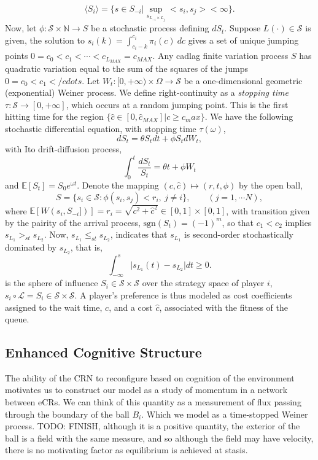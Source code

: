\documentclass[10pt]{article}
\newcommand{\mcL}{\mathcal{L}}
\newcommand{\mcS}{\mathcal{S}}
\theoremstyle{definition}
\begin{document}
$$
    \langle S_i\rangle = \big\lbrace s \in S_{-i} \vert \sup_{s_{L_{-i}\times
    L_j}} <s_i, s_j> < \infty\big\rbrace.
$$
Now, let $\phi:\mcS\times \mathbb{N} \rightarrow S$ be a stochastic process
defining $dS_t$.
Suppose $L(\cdot)\in \mcS$ is given, the solution to
$s_i(k) = \int_{c_i - k}^{c_i} \pi_i(c) \ dc$ gives a set of unique jumping points $0=c_0<
c_1< \cdots < c_{L_{MAX}} = c_{MAX}$. 
Any cadlag finite variation process $S$ has quadratic variation equal to the sum
of the squares of the jumps $0=c_0<c_1</cdots$.
Let $W_t: [0, +\infty) \times \Omega \rightarrow \mcS$ be a
one-dimensional geometric (exponential) Weiner process. We define right-continuity as 
a \emph{stopping time} $\tau:\mcS \rightarrow [0,+\infty]$, which occurs at a random jumping point. This is the first hitting time
for the region $\lbrace \hat c \in [0,\hat c_{MAX}] \vert c \ge c_max\rbrace$.
We have the following stochastic differential equation, with stopping time
$\tau(\omega)$,
$$
    dS_t = \theta S_t dt + \phi S_t dW_t,
$$
with Ito drift-diffusion process,
$$
    \displaystyle\int_0^t \frac{dS_t}{S_t} = \theta t + \phi W_t
$$
and $\mathbb{E}[S_t] = S_0e^{\omega t}$.
Denote the mapping $(c, \hat c) \mapsto (r, t, \phi)$ by the open ball,
$$
    S = \lbrace s_i \in \mcS : \phi(s_i, s_j) < r_i, \ j\ne i \rbrace, \qquad (j
    = 1, \cdots N),
$$
where $\mathbb{E}[W(s_i, S_{-i}])] = r_i = \sqrt{c^2 + \hat c^2} \in [0,1]\times
[0,1]$, with transition given by the pairity of the arrival process,
$\text{sgn}(S_t) = (-1)^m$, so that $c_1<c_2$ implies $s_{L_1} >_{st} s_{L_2}$.
Now, $s_{L_1} \le_{st} s_{L_2}$, indicates that $s_{L_1}$ is second-order
stochastically dominated by $s_{L_2}$, that is, 
$$
    \displaystyle\int_{-\infty}^s\vert s_{L_1}(t) - s_{L_2} \vert dt \ge 0.
$$
is the sphere of influence $S_i \in \mcS\times\mcS$ over the strategy
space of player $i$, $s_i\circ\mcL = S_i \in \mcS\times\mcS$.
A player's preference is thus modeled as cost coefficients assigned to the wait
time, $c$, and a cost $\hat c$, associated with the fitness of the queue.

\subsection{Enhanced Cognitive Structure}

The ability of the CRN to reconfigure based on cognition of the environment
motivates us to construct our model as a study of momentum in a network between eCRs. 
We can think of this quantity as a measurement of flux passing through the
boundary of the ball $B_i$. Which we model as a time-stopped Weiner process.
TODO: FINISH, although it is a positive quantity, the exterior of
the ball is a field with the same measure, and so although the field may have
velocity, there is no motivating factor as equilibrium is achieved at stasis.
\end{document}
